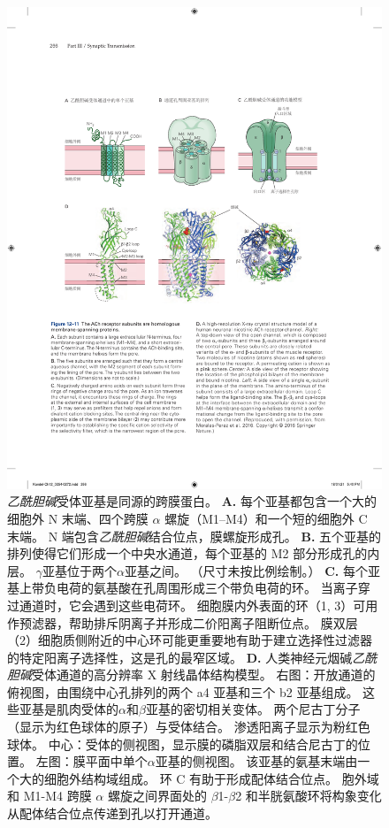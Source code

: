 \begin{figure}[htbp]
	\centering
	\includegraphics[width=1.0\linewidth]{chap12/fig_12_11}
	\caption{\textit{乙酰胆碱}受体亚基是同源的跨膜蛋白。
		\textbf{A.} 每个亚基都包含一个大的细胞外 N 末端、四个跨膜 $\alpha$ 螺旋（M1–M4）和一个短的细胞外 C 末端。
		N 端包含\textit{乙酰胆碱}结合位点，膜螺旋形成孔。
		\textbf{B.} 五个亚基的排列使得它们形成一个中央水通道，每个亚基的 M2 部分形成孔的内层。
		$\gamma$亚基位于两个$\alpha$亚基之间。 （尺寸未按比例绘制。）
		\textbf{C.} 每个亚基上带负电荷的氨基酸在孔周围形成三个带负电荷的环。
		当离子穿过通道时，它会遇到这些电荷环。
		细胞膜内外表面的环（1, 3）可用作预滤器，帮助排斥阴离子并形成二价阳离子阻断位点。
		膜双层（2）细胞质侧附近的中心环可能更重要地有助于建立选择性过滤器的特定阳离子选择性，这是孔的最窄区域。
		\textbf{D.} 人类神经元烟碱\textit{乙酰胆碱}受体通道的高分辨率 X 射线晶体结构模型。
		右图：开放通道的俯视图，由围绕中心孔排列的两个 a4 亚基和三个 b2 亚基组成。
		这些亚基是肌肉受体的$\alpha$和$\beta$亚基的密切相关变体。
		两个尼古丁分子（显示为红色球体的原子）与受体结合。
		渗透阳离子显示为粉红色球体。
		中心：受体的侧视图，显示膜的磷脂双层和结合尼古丁的位置。
		左图：膜平面中单个$\alpha$亚基的侧视图。
		该亚基的氨基末端由一个大的细胞外结构域组成。
		环 C 有助于形成配体结合位点。
		胞外域和 M1-M4 跨膜 $\alpha$ 螺旋之间界面处的 $\beta$1-$\beta$2 和半胱氨酸环将构象变化从配体结合位点传递到孔以打开通道\cite{morales2016x}。}
	\label{fig:12_11}
\end{figure}


